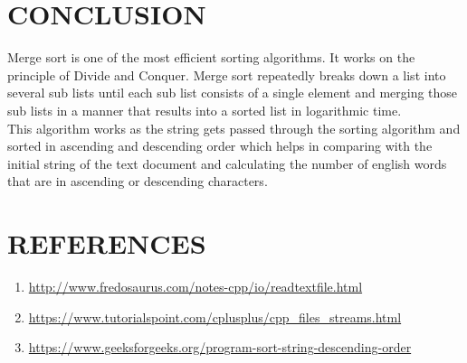 \documentclass[conference]{IEEEtran}
\begin{document}
\section{CONCLUSION}
Merge sort is one of the most efficient sorting 
algorithms. It works on the principle of Divide and 
Conquer. Merge sort repeatedly breaks down a list 
into several sub lists until each sub list consists of a single element and merging those sub lists in a manner that results into a sorted list in logarithmic time. 
\\This algorithm works as the string gets passed through the sorting algorithm and sorted in ascending and descending order which helps in 
comparing with the initial string of the text 
document and calculating the number of english 
words that are in ascending or descending 
characters. 

\section{REFERENCES}
\begin{enumerate}
    \item \url{  http://www.fredosaurus.com/notes-cpp/io/readtextfile.html }
    \item \url{ https://www.tutorialspoint.com/cplusplus/cpp_files_streams.html }
    \item \url{ https://www.geeksforgeeks.org/program-sort-string-descending-order}
\end{enumerate}
\end{document}
